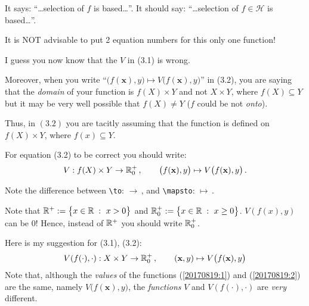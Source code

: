 
\def\bfx{\mathbf{x}}

\begin{description}[style=unboxed,leftmargin=0cm,itemsep=3ex]

It says: ``\dots selection of $f$ is based\dots''.
It should say: ``\dots selection of $f\in\mathscr{H}$ is based\dots''.

\mbox{}\newline
It is NOT advisable to put 2 equation numbers for this only one function!

I guess you now know that the $V$ in (3.1) is wrong.

Moreover, when you write ``$\big(f(\bfx),y\big)\mapsto V\big(f(\bfx),y\big)$''
in (3.2), you are saying that the {\em domain\/} of your function is
$f(X)\times Y$ and not $X\times Y$, where $f(X)\subseteq Y$ but it may
be very well possible that $f(X)\neq Y$ ($f$ could be not {\em onto\/}).

Thus, in $(3.2)$ you are tacitly assuming that the function is defined on
$f(X)\times Y$, where $f(x)\subseteq Y$.

For equation (3.2) to be correct you should write:
\begin{equation}\label{20170819:1}
V:f(X)\times Y\to\R_0^+\,,\qquad
\big(f(\bfx),y\big)\mapsto V\big(f(\bfx),y\big)\,.
\end{equation}

Note the difference between \verb|\to|: $\to$\,, 
and \verb|\mapsto|: $\mapsto$\,.

Note that ${\mathbb R }^+:=\big\{ x\in{\mathbb R }\;:\  x>0 \big\}$ and
${\mathbb R }_0^+:=\big\{ x\in{\mathbb R }\;:\  x\geq0 \big\}$.
$V(f(x),y)$ can be 0!
Hence, instead of ${\mathbb R }^+$ you should write ${\mathbb R }_0^+$.

Here is my suggestion for (3.1), (3.2):
\begin{equation}\label{20170819:2}
V(f(\cdot),\cdot):X\times Y\to\R_0^+\,,\qquad
(\bfx,y)\mapsto V\big(f(\bfx),y\big)
\end{equation}
Note that, although the {\em values\/} of the functions (\ref{20170819:1})
and (\ref{20170819:2}) are the same, namely $V\big(f(\bfx),y\big)$, the
{\em functions\/} $V$ and $V(f(\cdot),\cdot)$ are {\em very\/} different.


\end{description}
